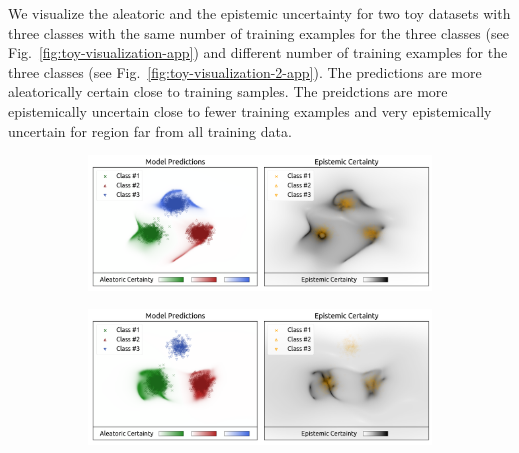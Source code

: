 We visualize the aleatoric and the epistemic uncertainty for two toy datasets with three classes with the same number of training examples for the three classes (see Fig.~\ref{fig:toy-visualization-app}) and different number of training examples for the three classes (see Fig.~\ref{fig:toy-visualization-2-app}). The predictions are more aleatorically certain close to training samples. The preidctions are more epistemically uncertain close to fewer training examples and very epistemically uncertain for region far from all training data.

\begin{figure}[ht!]
    \centering
    \caption{Visualization of the aleatoric and epistemic uncertainty on a 2D toy dataset with 3 classes with $900$ training samples for each class.}
    \label{fig:toy-visualization-app}
    \begin{subfigure}[t]{.75\textwidth}
        \centering
        \includegraphics[width=1\textwidth]{sections/007_iclr2022/resources/appendix/toy-900-900-900.png}
    \end{subfigure}%
\end{figure}

\begin{figure}[ht!]
    \centering
    \caption{Visualization of the aleatoric and epistemic uncertainty on a 2D toy dataset with 3 classes with $900$ training samples for class 1 (green), $600$ training samples for class 2 (red) and $300$ training samples for class 2 (blue).}
    \label{fig:toy-visualization-2-app}
    \begin{subfigure}[t]{.75\textwidth}
        \centering
        \includegraphics[width=1\textwidth]{sections/007_iclr2022/resources/appendix/toy-900-600-300.png}
    \end{subfigure}%
\end{figure}

